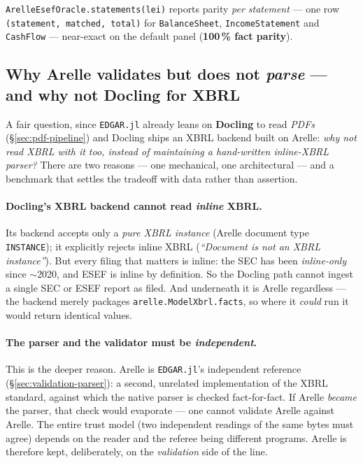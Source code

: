\documentclass[11pt,a4paper]{report}
\begin{document}
\noindent \texttt{ArelleEsefOracle.statements(lei)} reports parity \emph{per statement} --- one row
\texttt{(statement, matched, total)} for \texttt{BalanceSheet}, \texttt{IncomeStatement} and
\texttt{CashFlow} --- near-exact on the default panel (\textbf{100\,\% fact parity}).

\subsection{Why Arelle validates but does not \emph{parse} --- and why not Docling for XBRL}
\label{sec:validation-arelle-vs-parse}

A fair question, since \texttt{EDGAR.jl} already leans on \textbf{Docling} to read \emph{PDFs}
(\S\ref{sec:pdf-pipeline}) and Docling ships an XBRL backend built on Arelle: \emph{why not read XBRL with it
too, instead of maintaining a hand-written inline-XBRL parser?} There are two reasons --- one mechanical, one
architectural --- and a benchmark that settles the tradeoff with data rather than assertion.

\paragraph{Docling's XBRL backend cannot read \emph{inline} XBRL.} Its backend accepts only a \emph{pure XBRL
instance} (Arelle document type \texttt{INSTANCE}); it explicitly rejects inline XBRL (\emph{``Document is not
an XBRL instance''}). But every filing that matters is inline: the SEC has been \emph{inline-only} since
\(\sim\)2020, and ESEF is inline by definition. So the Docling path cannot ingest a single SEC or ESEF report
as filed. And underneath it is Arelle regardless --- the backend merely packages
\texttt{arelle.ModelXbrl.facts}, so where it \emph{could} run it would return identical values.

\paragraph{The parser and the validator must be \emph{independent}.} This is the deeper reason. Arelle is
\texttt{EDGAR.jl}'s independent reference (\S\ref{sec:validation-parser}): a second, unrelated implementation
of the XBRL standard, against which the native parser is checked fact-for-fact. If Arelle \emph{became} the
parser, that check would evaporate --- one cannot validate Arelle against Arelle. The entire trust model (two
independent readings of the same bytes must agree) depends on the reader and the referee being different
programs. Arelle is therefore kept, deliberately, on the \emph{validation} side of the line.
\end{document}
